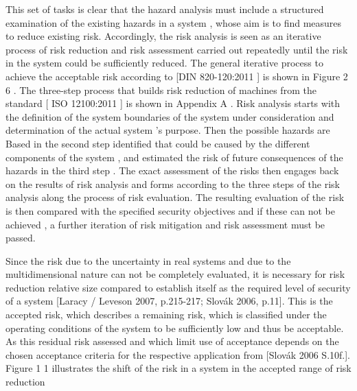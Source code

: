 \documentclass{template/openetcs_report}
\begin{document}
This set of tasks is clear that the hazard analysis must include a structured examination of the existing hazards in a system , whose aim is to find measures to reduce existing risk. Accordingly, the risk analysis is seen as an iterative process of risk reduction and risk assessment carried out repeatedly until the risk in the system could be sufficiently reduced. The general iterative process to achieve the acceptable risk according to [DIN 820-120:2011 ] is shown in Figure 2 6 . The three-step process that builds risk reduction of machines from the standard [ ISO 12100:2011 ] is shown in Appendix A .
Risk analysis starts with the definition of the system boundaries of the system under consideration and determination of the actual system 's purpose. Then the possible hazards are Based in the second step identified that could be caused by the different components of the system , and estimated the risk of future consequences of the hazards in the third step . The exact assessment of the risks then engages back on the results of risk analysis and forms according to the three steps of the risk analysis along the process of risk evaluation. The resulting evaluation of the risk is then compared with the specified security objectives and if these can not be achieved , a further iteration of risk mitigation and risk assessment must be passed.

Since the risk due to the uncertainty in real systems and due to the multidimensional nature can not be completely evaluated, it is necessary for risk reduction relative size compared to establish itself as the required level of security of a system [Laracy / Leveson 2007, p.215-217; Slovák 2006, p.11]. This is the accepted risk, which describes a remaining risk, which is classified under the operating conditions of the system to be sufficiently low and thus be acceptable. As this residual risk assessed and which limit use of acceptance depends on the chosen acceptance criteria for the respective application from [Slovák 2006 S.10f.]. Figure 1 1 illustrates the shift of the risk in a system in the accepted range of risk reduction
\end{document}
